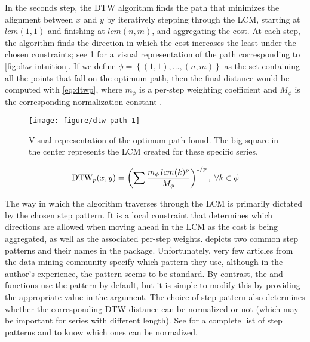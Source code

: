 In the seconds step,
the DTW algorithm finds the path that minimizes the alignment between $x$ and $y$ by iteratively stepping through the LCM,
starting at $lcm(1,1)$ and finishing at $lcm(n,m)$,
and aggregating the cost.
At each step, the algorithm finds the direction in which the cost increases the least under the chosen constraints;
see \cref{fig:dtw-path} for a visual representation of the path corresponding to \cref{fig:dtw-intuition}.
If we define $\phi = \left\{ (1,1), \ldots, (n,m) \right\}$ as the set containing all the points that fall on the optimum path,
then the final distance would be computed with \cref{eq:dtwp},
where $m_\phi$ is a per-step weighting coefficient and $M_\phi$ is the corresponding normalization constant \citep{giorgino2009}.

\begin{figure}[htbp]

{\centering \texttt{[image: figure/dtw-path-1]}

}

\caption{Visual representation of the optimum path found. The big square in the center represents the LCM created for these specific series.}\label{fig:dtw-path}
\end{figure}

\begin{equation}
\label{eq:dtwp}
\text{DTW}_p{}(x,y) = \left( \sum \frac{m_\phi \, lcm(k) ^ p}{M_\phi} \right) ^ {1/p}, \; \forall k \in \phi
\end{equation}

The way in which the algorithm traverses through the LCM is primarily dictated by the chosen step pattern.
It is a local constraint that determines which directions are allowed when moving ahead in the LCM as the cost is being aggregated,
as well as the associated per-step weights.
 depicts two common step patterns and their names in the  package.
Unfortunately, very few articles from the data mining community specify which pattern they use,
although in the author's experience,
the  pattern seems to be standard.
By contrast, the  and  functions use the  pattern by default,
but it is simple to modify this by providing the appropriate value in the  argument.
The choice of step pattern also determines whether the corresponding DTW distance can be normalized or not
(which may be important for series with different length).
See \citet{giorgino2009} for a complete list of step patterns and to know which ones can be normalized.


